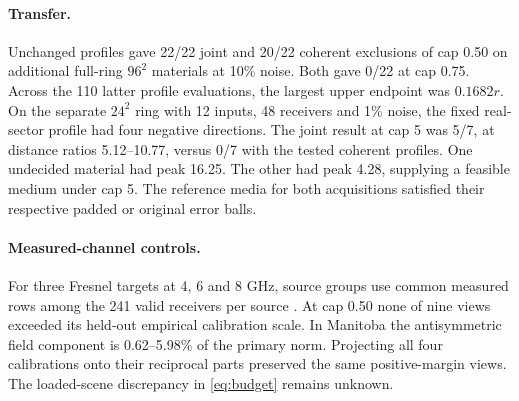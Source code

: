 \paragraph{Transfer.}
Unchanged profiles gave 22/22 joint and 20/22 coherent exclusions of cap 0.50 on additional full-ring $96^2$ materials at 10\% noise. Both gave 0/22 at cap 0.75. Across the 110 latter profile evaluations, the largest upper endpoint was $0.1682r$. On the separate $24^2$ ring with 12 inputs, 48 receivers and 1\% noise, the fixed real-sector profile had four negative directions. The joint result at cap 5 was 5/7, at distance ratios 5.12--10.77, versus 0/7 with the tested coherent profiles. One undecided material had peak 16.25. The other had peak 4.28, supplying a feasible medium under cap 5. The reference media for both acquisitions satisfied their respective padded or original error balls.

\paragraph{Measured-channel controls.}
For three Fresnel targets at 4, 6 and 8 GHz, source groups use common measured rows among the 241 valid receivers per source \cite{fresnel}. At cap 0.50 none of nine views exceeded its held-out empirical calibration scale. In Manitoba the antisymmetric field component is 0.62--5.98\% of the primary norm. Projecting all four calibrations onto their reciprocal parts preserved the same positive-margin views. The loaded-scene discrepancy in \eqref{eq:budget} remains unknown.

\FloatBarrier

